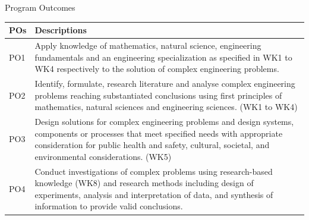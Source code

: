 \documentclass[aspectratio=169,11pt]{beamer}
\newcommand{\source}[1]{\par\vfill{\tiny\color{gray}Source: Criterion 8 SAR, #1.}}
\begin{document}
\begin{frame}{Program Outcomes}
\small
\renewcommand{\arraystretch}{1.35}
\begin{tabularx}{\textwidth}{@{}p{10mm}Y@{}}
\toprule\textbf{POs} & \textbf{Descriptions}\\\midrule
PO1 & Apply knowledge of mathematics, natural science, engineering fundamentals and an engineering specialization as specified in WK1 to WK4 respectively to the solution of complex engineering problems.\\
PO2 & Identify, formulate, research literature and analyse complex engineering problems reaching substantiated conclusions using first principles of mathematics, natural sciences and engineering sciences. (WK1 to WK4)\\
PO3 & Design solutions for complex engineering problems and design systems, components or processes that meet specified needs with appropriate consideration for public health and safety, cultural, societal, and environmental considerations. (WK5)\\
PO4 & Conduct investigations of complex problems using research-based knowledge (WK8) and research methods including design of experiments, analysis and interpretation of data, and synthesis of information to provide valid conclusions.\\

\bottomrule
\end{tabularx}
\end{frame}
\end{document}
